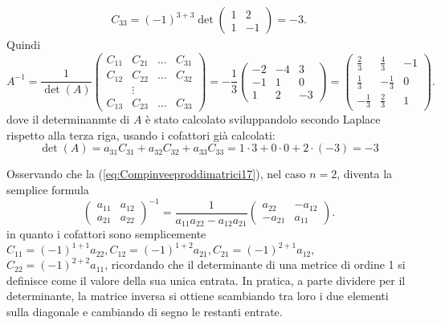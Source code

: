 \begin{es}
\begin{eqnarray*}
    C_{33}=(-1)^{3+3}\det
    \begin{pmatrix}
      1 & 2\\
      1 & -1
    \end{pmatrix}=-3.
  \end{eqnarray*}
  Quindi
  \begin{equation*}
    A^{-1}=\frac{1}{\det(A)}
    \begin{pmatrix}
      C_{11} & C_{21} & \dots & C_{31}\\
      C_{12} & C_{22} & \dots & C_{32}\\
             & \vdots\\
      C_{13} & C_{23} &\dots & C_{33}
    \end{pmatrix}=-\frac{1}{3}
    \begin{pmatrix}
      -2 & -4 & 3\\
      -1 & 1 & 0\\
      1 & 2 & -3
    \end{pmatrix}=
    \begin{pmatrix}
      \frac{2}{3} & \frac{4}{3} & -1\\
      \frac{1}{3} & -\frac{1}{3} & 0\\
      -\frac{1}{3}&\frac{2}{3} & 1
    \end{pmatrix}.
  \end{equation*}
  dove il determinanmte di $A$ è stato calcolato sviluppandolo secondo Laplace rispetto alla
  terza riga, usando i cofattori già calcolati:
  \begin{equation*}
    \det(A)=a_{31}C_{31}+a_{32}C_{32}+a_{33}C_{33}=1\cdot 3+0\cdot 0+2\cdot (-3)=-3
  \end{equation*}
\end{es}\clearpage
\begin{oss}
  \label{oss:Compinveeproddimatrici5}
  Osservando che la (\ref{eq:Compinveeproddimatrici17}), nel caso $n=2$, diventa la semplice formula
  \begin{equation}
    \label{eq:Compinveeproddimatrici18}
    \begin{pmatrix}
      a_{11} & a_{12}\\
      a_{21} & a_{22}
    \end{pmatrix}^{-1}=\frac{1}{a_{11}a_{22}-a_{12}a_{21}}
    \begin{pmatrix}
      a_{22}&-a_{12}\\
      -a_{21} & a_{11}
    \end{pmatrix}.
  \end{equation}
  in quanto i cofattori sono semplicemente $C_{11}=(-1)^{1+1}a_{22},C_{12}=(-1)^{1+2}a_{21}, C_{21}=(-1)^{2+1}a_{12},$ \\$C_{22}=(-1)^{2+2}a_{11}$, ricordando che il determinante di una metrice di
  ordine 1 si definisce come il valore della sua unica entrata. In pratica, a parte dividere per
  il determinante, la matrice inversa si ottiene scambiando tra loro i due elementi sulla diagonale
  e cambiando di segno le restanti entrate.
\end{oss}
